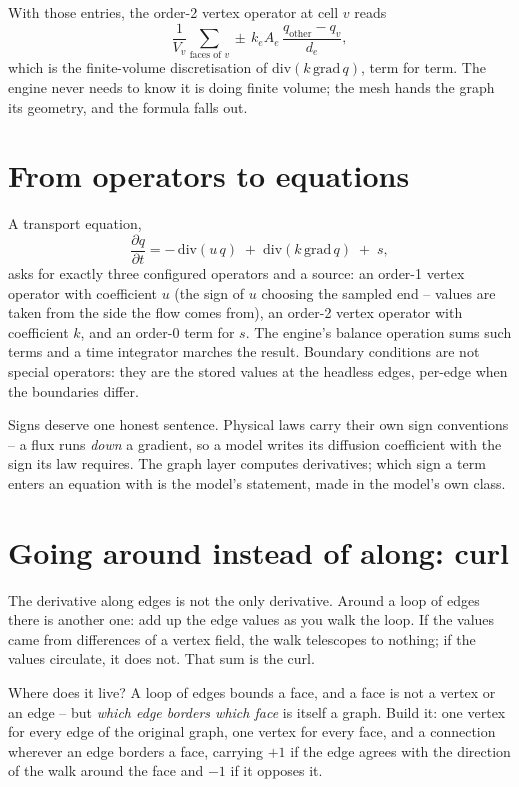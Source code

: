 \documentclass[11pt]{article}
\begin{document}
With those entries, the order-2 vertex operator at cell $v$ reads
\[
\frac{1}{V_v}\sum_{\text{faces of } v} \pm\, k_e A_e\,
\frac{q_{\text{other}} - q_v}{d_e},
\]
which is the finite-volume discretisation of
$\mathrm{div}(k\,\mathrm{grad}\,q)$, term for term. The engine never
needs to know it is doing finite volume; the mesh hands the graph its
geometry, and the formula falls out.

\section{From operators to equations}\label{sec:pdes}

A transport equation,
\[
\frac{\partial q}{\partial t}
 = -\,\mathrm{div}(u\,q) \;+\; \mathrm{div}(k\,\mathrm{grad}\,q)
   \;+\; s,
\]
asks for exactly three configured operators and a source: an order-1
vertex operator with coefficient $u$ (the sign of $u$ choosing the
sampled end -- values are taken from the side the flow comes from),
an order-2 vertex operator with coefficient $k$, and an order-0 term
for $s$. The engine's balance operation sums such terms and a time
integrator marches the result. Boundary conditions are not special
operators: they are the stored values at the headless edges,
per-edge when the boundaries differ.

Signs deserve one honest sentence. Physical laws carry their own sign
conventions -- a flux runs \emph{down} a gradient, so a model writes
its diffusion coefficient with the sign its law requires. The graph
layer computes derivatives; which sign a term enters an equation with
is the model's statement, made in the model's own class.

\section{Going around instead of along: curl}\label{sec:curl}

The derivative along edges is not the only derivative. Around a loop
of edges there is another one: add up the edge values as you walk the
loop. If the values came from differences of a vertex field, the walk
telescopes to nothing; if the values circulate, it does not. That sum
is the curl.

Where does it live? A loop of edges bounds a face, and a face is not
a vertex or an edge -- but \emph{which edge borders which face} is
itself a graph. Build it: one vertex for every edge of the original
graph, one vertex for every face, and a connection wherever an edge
borders a face, carrying $+1$ if the edge agrees with the direction
of the walk around the face and $-1$ if it opposes it.
\end{document}
